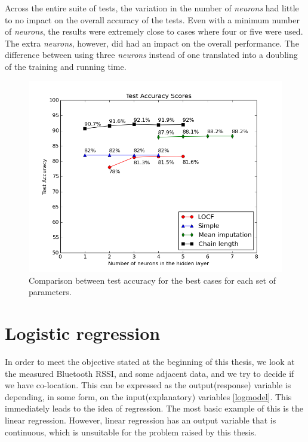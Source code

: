 Across the entire suite of tests, the variation in the number of \textit{neurons} had little to no impact on the overall accuracy of the tests. Even with a minimum number of \textit{neurons}, the results were extremely close to cases where four or five were used. The extra \textit{neurons}, however, did had an impact on the overall performance. The difference between using three \textit{neurons} instead of one translated into a doubling of the training and running time. 

\begin{figure}[h]
	\begin{center}
		\includegraphics[scale=0.6]{figures/ann_total.png}
	\end{center}
	
	\caption{Comparison between test accuracy for the best cases for each set of parameters.}
	\label{pic:ann_total}

\end{figure}
     

\section{Logistic regression}

In order to meet the objective stated at the beginning of this thesis, we look at the measured Bluetooth RSSI, and some adjacent data, and we try to decide if we have co-location. This can be expressed as the output(response) variable is depending, in some form, on the input(explanatory) variables  \ref{logmodel}. This immediately leads to the idea of regression. The most basic example of this is the linear regression. However, linear regression has an output variable that is continuous, which is unsuitable for the problem raised by this thesis.

